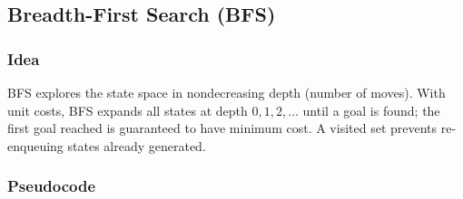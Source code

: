  \subsection{Breadth-First Search (BFS)}
  \subsubsection{Idea}
  BFS explores the state space in nondecreasing depth (number of moves). With unit costs, BFS expands all states at depth $0,1,2,\dots$ until a goal is
  found; the first goal reached is guaranteed to have minimum cost. A visited set prevents re-enqueuing states already generated.

  \subsubsection{Pseudocode }
  

